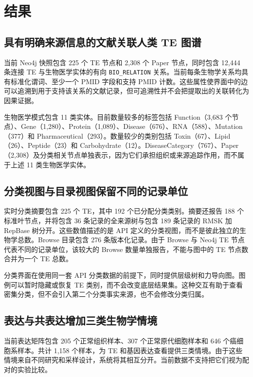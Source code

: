 \section{结果}

\subsection{具有明确来源信息的文献关联人类 TE 图谱}

当前 Neo4j 快照包含 225 个 TE 节点和 2,308 个 Paper 节点，同时包含 12,444 条连接 TE 与生物医学实体的有向 \texttt{BIO\_RELATION} 关系。当前每条生物学关系均具有标准化谓词、至少一个 PMID 字段和支持 PMID 计数。这些属性使界面中的边可以追溯到用于支持该关系的文献记录，但可追溯性并不会把提取出的关联转化为因果证据。

生物医学模式包含 11 类实体。目前数量较多的标签包括 Function（3,683 个节点）、Gene（1,280）、Protein（1,089）、Disease（676）、RNA（588）、Mutation（377）和 Pharmaceutical（293）。数量较少的类别包括 Toxin（67）、Lipid（26）、Peptide（23）和 Carbohydrate（12）。DiseaseCategory（767）、Paper（2,308）及分类相关节点单独表示，因为它们承担组织或来源追踪作用，而不属于上述 11 类生物医学实体。



\subsection{分类视图与目录视图保留不同的记录单位}

实时分类摘要包含 225 个 TE，其中 192 个已分配分类类别。摘要还报告 188 个标准叶节点，并将包含 36 条记录的全来源树与包含 189 条记录的 RMSK 加 RepBase 树分开。这些数值描述的是 API 定义的分类视图，而不是彼此独立的生物学总数。Browse 目录包含 276 条版本化记录。由于 Browse 与 Neo4j TE 节点代表不同的记录单位，该较大的 Browse 数量单独报告，不能与图中的 TE 节点数合并为一个 TE 总数。

分类界面在使用同一套 API 分类数据的前提下，同时提供层级树和力导向图。图例可以暂时隐藏或恢复 TE 类别，而不会改变底层结果集。这种交互有助于查看密集分类，但不会引入第二个分类事实来源，也不会修改分类归属。

\subsection{表达与共表达增加三类生物学情境}

当前表达矩阵包含 205 个正常组织样本、307 个正常原代细胞样本和 646 个癌细胞系样本。共计 1,158 个样本，为 TE 和基因表达查看提供三类情境。由于这些情境来自不同研究和采样设计，系统将其相互分开。当前数据不支持把它们视为配对的实验比较。

